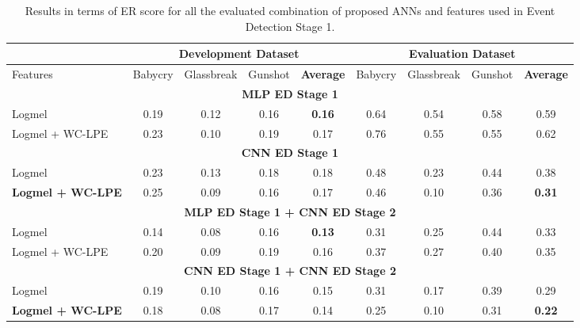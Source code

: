 \begin{table}[t]	
	\caption{Results in terms of ER score for all the evaluated combination of proposed ANNs and features used in Event Detection Stage 1.}
	\centering
	\footnotesize
	\begin{tabular}{l|c|c|c|c|c|c|c|c|}
		\cline{2-9}
		& \multicolumn{4}{c|}{\textbf{Development Dataset}}          & \multicolumn{4}{c|}{\textbf{Evaluation Dataset}}                 \\ \hline
		\multicolumn{1}{|l|}{Features}         & Babycry & Glassbreak & Gunshot & \textbf{Average} & Babycry & Glassbreak & Gunshot & \textbf{Average} \\ \hline
		\multicolumn{9}{|c|}{\textbf{MLP ED Stage 1 }}                                                                                                          \\ \hline
		\multicolumn{1}{|l|}{Logmel}         & 0.19    & 0.12       & 0.16    & \textbf{0.16}    & 0.64    & 0.54       & 0.58    & 0.59             \\ \hline
		\multicolumn{1}{|l|}{Logmel + WC-LPE} & 0.23    & 0.10       & 0.19    & 0.17             & 0.76   & 0.55       & 0.55    & 0.62             \\ \hline
		\multicolumn{9}{|c|}{\textbf{CNN ED Stage 1}}                                                                                                          \\ \hline
		\multicolumn{1}{|l|}{Logmel}         & 0.23    & 0.13       & 0.18    & 0.18             & 0.48    & 0.23       & 0.44    & 0.38             \\ \hline
		\multicolumn{1}{|l|}{\textbf{Logmel + WC-LPE}} & 0.25    & 0.09       & 0.16    & 0.17             & 0.46    & 0.10       & 0.36    & \textbf{0.31}    \\ \hline
		\hline
		\multicolumn{9}{|c|}{\textbf{MLP ED Stage 1 + CNN ED Stage 2}}                                                                                       \\ \hline
		\multicolumn{1}{|l|}{Logmel}         & 0.14    & 0.08       & 0.16    & \textbf{0.13}    & 0.31    & 0.25       & 0.44    & 0.33             \\ \hline
		\multicolumn{1}{|l|}{Logmel + WC-LPE} & 0.20    & 0.09       & 0.19    & 0.16             & 0.37    & 0.27       & 0.40    & 0.35             \\ \hline
		\multicolumn{9}{|c|}{\textbf{CNN ED Stage 1 + CNN ED Stage 2}}                                                                                        \\ \hline
		\multicolumn{1}{|l|}{Logmel}         & 0.19    & 0.10       & 0.16    & 0.15             & 0.31    & 0.17       & 0.39    & 0.29             \\ \hline
		\multicolumn{1}{|l|}{\textbf{Logmel + WC-LPE}} & 0.18    & 0.08       & 0.17    & 0.14             & 0.25    & 0.10       & 0.31    & \textbf{0.22}    \\ \hline
	\end{tabular}
	\label{tab:results}
\end{table}

